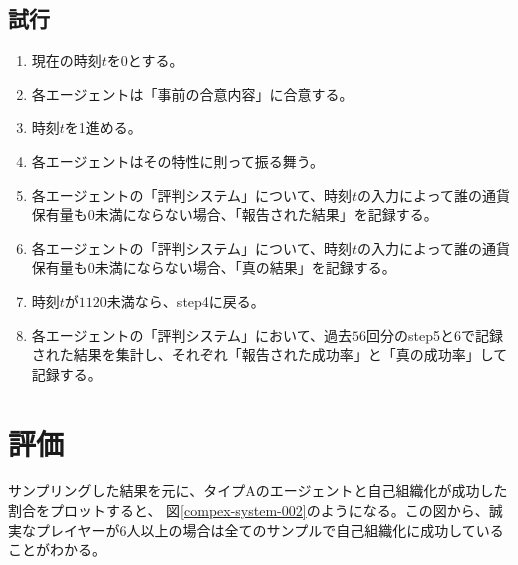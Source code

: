   \subsection{試行}
    \begin{enumerate}
      \item 現在の時刻$t$を$0$とする。
      \item 各エージェントは「事前の合意内容」に合意する。
      \item 時刻$t$を1進める。
      \item 各エージェントはその特性に則って振る舞う。
      \item 各エージェントの「評判システム」について、時刻$t$の入力によって誰の通貨保有量も0未満にならない場合、「報告された結果」を記録する。
      \item 各エージェントの「評判システム」について、時刻$t$の入力によって誰の通貨保有量も0未満にならない場合、「真の結果」を記録する。
      \item 時刻$t$が$1120$未満なら、step4に戻る。
      \item 各エージェントの「評判システム」において、過去$56$回分のstep5と6で記録された結果を集計し、それぞれ「報告された成功率」と「真の成功率」して記録する。
    \end{enumerate}

\section{評価}
サンプリングした結果を元に、タイプAのエージェントと自己組織化が成功した割合をプロットすると、
図\ref{compex-system-002}のようになる。この図から、誠実なプレイヤーが6人以上の場合は全てのサンプルで自己組織化に成功していることがわかる。

